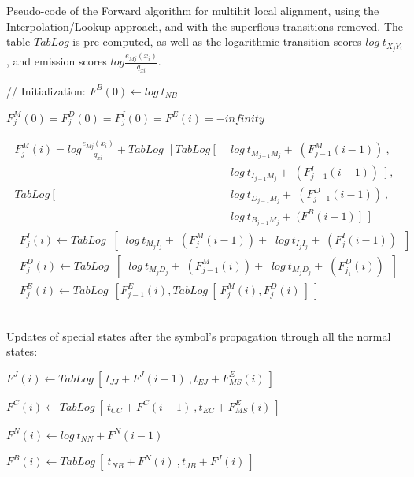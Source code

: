 \begin{algorithm}[htb!]
\caption[Forward algorithm for multihit local alignment] {Pseudo-code of the Forward algorithm for multihit local alignment, using the Interpolation/Lookup approach, and with the superflous transitions removed. The table $TabLog$ is pre-computed, as well as the logarithmic transition scores $log \; t_{X_j Y_i }$, and emission scores $log \frac{e_{Mj}(x_i) }{q_{xi}} $.}
\label{code-forward}
\begin{algorithmic}

\State // Initialization:
\State	$  F^B (0) \gets log\ t_{N B}  $


	\State	$ F^M_j(0) = F^D_j(0) = F^I_j(0) = F^E (i) = -infinity $

		\begin{align*}
		 F^M_j(i) = log \frac{e_{Mj}(x_i) }{q_{xi}} + TabLog \;\;  
				[ \ TabLog \ [ \;\; &log\ t_{M_{j-1}M_j} + \; (F^M_{j-1}(i-1)) \ , \\ 
						\;\; &log\ t_{I_{j-1} M_j}  + \; (F^I_{j-1}(i-1)) \ \ ] \ , \\
				TabLog \ [	\;\; &log\ t_{D_{j-1} M_j} + \; (F^D_{j-1}(i-1)) \ , 	\\
						\;\; &log\ t_{B_{j-1} M_j} + \; (F^B (i-1) \ ] \;\; ] 
		\end{align*}
		\begin{align*}
		&F^I_j(i)  \gets TabLog \;\; [ \;\; log\ t_{M_{j} I_j} + \; (F^M_{j}(i-1))  
					     	 + \;\; log\ t_{I_{j} I_j}  + \; (F^I_{j}(i-1))  \;\; ] 
		\\
		&F^D_j(i) \gets TabLog \;\; [ \;\; log\ t_{M_{j} D_j} + \; (F^M_{j-1}(i)) 
					    	  +\;\; log\ t_{M_{j} D_j} + \; (F^D_{j_1}(i))  \;\; ]
		\\
		& F^E_j (i) \gets TabLog \ \ [ F^E_{j-1} (i), TabLog \ [ \ F^M_j(i),  F^D_j(i) \ ] \ ] 
		\end{align*}

	\EndFor
	
	\State \\ Updates of special states after the symbol's propagation through all the normal states:

	\State	$ F^J (i) \gets TabLog \ [\ t_{J J} + F^J(i-1) \ ,  t_{E J} + F^E_{MS} (i) \ ] $

	\State	$ F^C (i) \gets TabLog\ [\ t_{C C} + F^C(i-1) \ ,  t_{E C} + F^E_{MS} (i) \ ] $

	\State	$ F^N (i) \gets log \ t_{N N} + F^N(i-1) $
	
	\State	$ F^B (i) \gets TabLog\ [\ t_{N B} + F^N(i) \ , t_{J B} + F^J(i) \ ] $

\EndFor

\end{algorithmic}
\end{algorithm}

